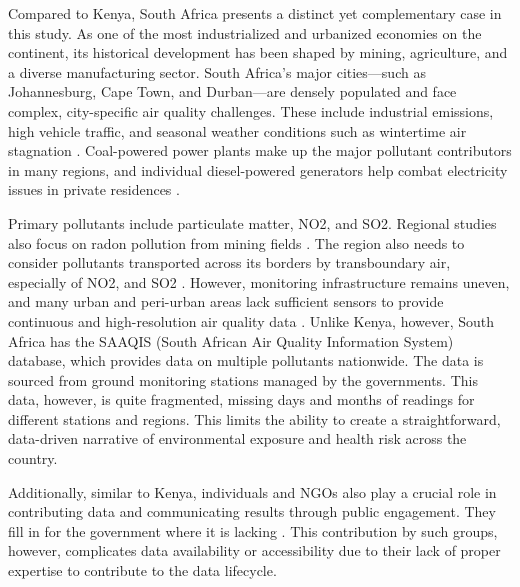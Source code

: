 \documentclass{article}
\begin{document}
Compared to Kenya, South Africa presents a distinct yet complementary case in this study. As one of the most industrialized and urbanized economies on the continent, its historical development has been shaped by mining, agriculture, and a diverse manufacturing sector. South Africa’s major cities—such as Johannesburg, Cape Town, and Durban—are densely populated and face complex, city-specific air quality challenges. These include industrial emissions, high vehicle traffic, and seasonal weather conditions such as wintertime air stagnation \cite{liebenberg-enslin_air_2024}. Coal-powered power plants make up the major pollutant contributors in many regions, and individual diesel-powered generators help combat electricity issues in private residences \cite{wright_impact_2024, makoni_coal-fired_2023}. 

Primary pollutants include particulate matter, NO2, and SO2. Regional studies also focus on radon pollution from mining fields \cite{mphaga_radon_2024}. The region also needs to consider pollutants transported across its borders by transboundary air, especially of NO2, and SO2 \cite{matandirotya_spatiotemporal_2021}. However, monitoring infrastructure remains uneven, and many urban and peri-urban areas lack sufficient sensors to provide continuous and high-resolution air quality data \cite{liebenberg-enslin_air_2024}. Unlike Kenya, however, South Africa has the SAAQIS (South African Air Quality Information System) database, which provides data on multiple pollutants nationwide. The data is sourced from ground monitoring stations managed by the governments. This data, however, is quite fragmented, missing days and months of readings for different stations and regions. This limits the ability to create a straightforward, data-driven narrative of environmental exposure and health risk across the country.

Additionally, similar to Kenya, individuals and NGOs also play a crucial role in contributing data and communicating results through public engagement. They fill in for the government where it is lacking \cite{najar_challenges_2025}. This contribution by such groups, however, complicates data availability or accessibility due to their lack of proper expertise to contribute to the data lifecycle.
\end{document}
